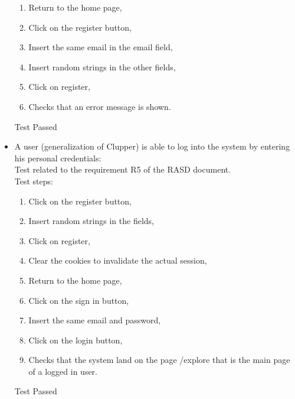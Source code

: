 \begin{itemize}
\begin{enumerate}
        \item Return to the home page,

        \item Click on the register button,

        \item Insert the same email in the email field,

        \item Insert random strings in the other fields,

        \item Click on register,

        \item Checks that an error message is shown.
    \end{enumerate}
    Test Passed \\

    \item A user (generalization of Clupper) is able to log into the system by entering his personal credentials: \\
    Test related to the requirement R5 of the RASD document. \\
    Test steps: \\
    \begin{enumerate}

        \item Click on the register button,

        \item Insert random strings in the fields,

        \item Click on register,

        \item Clear the cookies to invalidate the actual session,

        \item Return to the home page,

        \item Click on the sign in button,

        \item Insert the same email and password,

        \item Click on the login button,
        \item Checks that the system land on the page /explore that is the main page of a logged in user.
    \end{enumerate}
    Test Passed

\end{itemize}
